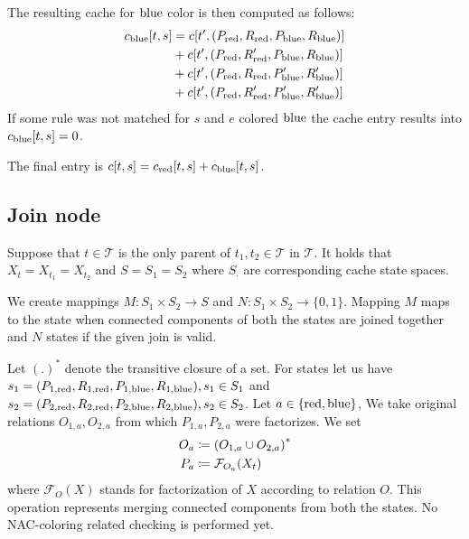 The resulting cache for \( \text{blue} \) color is then computed as follows:
%
\begin{align}
	c_{\text{blue}}[t, s] & = c[t^\prime, (P_{\text{red}}, R_{\text{red}}, P_{\text{blue}}, R_{\text{blue}})]   \notag                      \\
	              & + c[t^\prime, (P_{\text{red}}, R_{\text{red}}^\prime, P_{\text{blue}}, R_{\text{blue}})]   \notag               \\
	              & + c[t^\prime, (P_{\text{red}}, R_{\text{red}}, P_{\text{blue}}^\prime, R_{\text{blue}}^\prime)]   \notag        \\
	              & + c[t^\prime, (P_{\text{red}}, R_{\text{red}}^\prime, P_{\text{blue}}^\prime, R_{\text{blue}}^\prime)]   \notag
\end{align}
%
If some rule was not matched for \( s \) and \( e \) colored \( \text{blue} \)
the cache entry results into \( c_{\text{blue}}[t, s] = 0 \).

The final entry is \( c[t, s] = c_{\text{red}}[t, s] + c_{\text{blue}}[t, s] \).

\subsection{Join node}

Suppose that \( t \in \mathcal{T} \) is
the only parent of \( t_1, t_2 \in \mathcal{T} \) in \( \mathcal {T} \).
It holds that \( X_t = X_{t_1} = X_{t_2} \)
and \( S = S_1 = S_2 \) where \( S_\cdot \) are corresponding cache state spaces.

We create mappings \( M: S_1 \times S_2 \to S \) and \( N: S_1 \times S_2 \to \{0, 1\} \).
Mapping \( M \) maps to the state when connected components of both the states
are joined together and \( N \) states if the given join is valid.

Let \( {(.)}^* \) denote the transitive closure of a set.
For states let us have
\( s_1 = (P_{1,\text{red}}, R_{1,\text{red}}, P_{1,\text{blue}}, R_{1,\text{blue}}), s_1 \in S_1 \) and
\( s_2 = (P_{2,\text{red}}, R_{2,\text{red}}, P_{2,\text{blue}}, R_{2,\text{blue}}), s_2 \in S_2 \).
Let \( a \in \{\text{red}, \text{blue}\} \),
We take original relations \( O_{1, a}, O_{2, a} \)
from which \( P_{1, a}, P_{2, a} \) were factorizes.
We set
%
\begin{align}
	O_a & \coloneqq {(O_{1, a} \cup O_{2, a})}^*   \notag \\
	P_a & \coloneqq \mathcal{F}_{O_a}(X_t)
\end{align}
%
where \( \mathcal{F}_O(X) \) stands for factorization of \( X \)
according to relation \( O \). This operation represents merging connected
components from both the states. No NAC-coloring related checking is performed yet.

